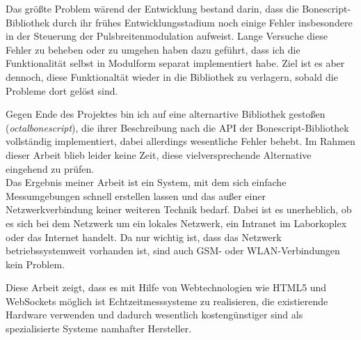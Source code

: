 Das größte Problem wärend der Entwicklung bestand darin, dass die Bonescript-Bibliothek durch ihr frühes Entwicklungsstadium noch einige Fehler insbesondere in der Steuerung der Pulsbreitenmodulation aufweist. Lange Versuche diese Fehler zu beheben oder zu umgehen haben dazu geführt, dass ich die Funktionalität selbst in Modulform separat implementiert habe. Ziel ist es aber dennoch, diese Funktionaltät wieder in die Bibliothek zu verlagern, sobald die Probleme dort gelöst sind. 

Gegen Ende des Projektes bin ich auf eine alternartive Bibliothek gestoßen (\textit{octalbonescript}), die ihrer Beschreibung nach die API der Bonescript-Bibliothek vollständig implementiert, dabei allerdings wesentliche Fehler behebt. Im Rahmen dieser Arbeit blieb leider keine Zeit, diese vielversprechende Alternative eingehend zu prüfen.\\

Das Ergebnis meiner Arbeit ist ein System, mit dem sich einfache Messumgebungen schnell erstellen lassen und das außer einer Netzwerkverbindung keiner weiteren Technik bedarf. Dabei ist es unerheblich, ob es sich bei dem Netzwerk um ein lokales Netzwerk, ein Intranet im Laborkoplex oder das Internet handelt. Da nur wichtig ist, dass das Netzwerk betriebssystemweit vorhanden ist, sind auch GSM- oder WLAN-Verbindungen kein Problem.

Diese Arbeit zeigt, dass es mit Hilfe von Webtechnologien wie HTML5 und WebSockets möglich ist Echtzeitmesssysteme zu realisieren, die existierende Hardware verwenden und dadurch wesentlich kostengünstiger sind als spezialisierte Systeme namhafter Hersteller.